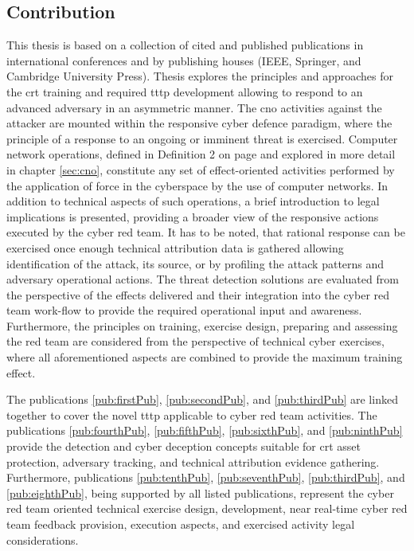 \subsection{Contribution}
\label{sec:contribution}
\glsresetall
This thesis is based on a collection of cited and published publications in international conferences and by publishing houses (IEEE, Springer, and Cambridge University Press).
Thesis explores the principles and approaches for the \gls{crt} training and required \gls{tttp} development allowing to respond to an advanced adversary in an asymmetric manner. The \gls{cno} activities against the attacker are mounted within the responsive cyber defence paradigm, where the principle of a response to an ongoing or imminent threat is exercised. Computer network operations, defined in Definition 2 on page \pageref{def:cno} and explored in more detail in chapter \ref{sec:cno}, constitute any set of effect-oriented activities performed by the application of force in the cyberspace by the use of computer networks. In addition to technical aspects of such operations, a brief introduction to legal implications is presented, providing a broader view of the responsive actions executed by the cyber red team. It has to be noted, that rational response can be exercised once enough technical attribution data is gathered allowing identification of the attack, its source, or by profiling the attack patterns and adversary operational actions. The threat detection solutions are evaluated from the perspective of the effects delivered and their integration into the cyber red team work-flow to provide the required operational input and awareness. Furthermore, the principles on training, exercise design, preparing and assessing the red team are considered from the perspective of technical cyber exercises, where all aforementioned aspects are combined to provide the maximum training effect.

The publications \ref{pub:firstPub}, \ref{pub:secondPub}, and \ref{pub:thirdPub} are linked together to cover the novel \gls{tttp} applicable to cyber red team activities. The publications \ref{pub:fourthPub}, \ref{pub:fifthPub}, \ref{pub:sixthPub}, and \ref{pub:ninthPub} provide the detection and cyber deception concepts suitable for \gls{crt} asset protection, adversary tracking, and technical attribution evidence gathering. Furthermore, publications \ref{pub:tenthPub}, \ref{pub:seventhPub}, \ref{pub:thirdPub}, and \ref{pub:eighthPub}, being supported by all listed publications, represent the cyber red team oriented technical exercise design, development, near real-time cyber red team feedback provision, execution aspects, and exercised activity legal considerations.

